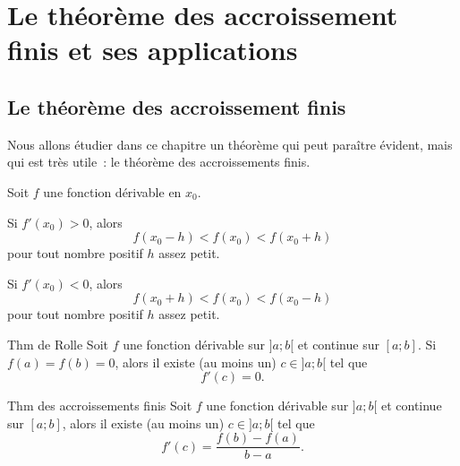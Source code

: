 \documentclass[a4paper,12pt]{article}
\begin{document}
\newpage
\section{Le théorème des accroissement finis et ses applications}

\subsection{Le théorème des accroissement finis}
Nous allons étudier dans ce chapitre un théorème qui peut paraître évident, mais qui est très utile~: le théorème des accroissements finis. 
\medskip

\begin{prop}
	\tcblower
Soit $f$ une fonction dérivable en $x_0$. 

Si $f'(x_0)>0$, alors
\[f(x_0-h)<f(x_0)<f(x_0+h)\]
pour tout nombre positif $h$ assez petit. 

Si $f'(x_0)<0$, alors
\[f(x_0+h)<f(x_0)<f(x_0-h)\]
pour tout nombre positif $h$ assez petit. 
\end{prop}

\begin{thm}
	Thm de Rolle
	\tcblower
	Soit $f$ une fonction dérivable sur $] a;b[$ et continue sur $[a;b]$. Si $f(a)=f(b)=0$, alors il existe (au moins un) $c\in] a;b[$ tel que 
	\[f'(c)=0.\]
\end{thm}
\begin{thm}
	Thm des accroissements finis
	\tcblower
	Soit $f$ une fonction dérivable sur $] a;b[$ et continue sur $[a;b]$, alors il existe (au moins un) $c\in ]a;b[$ tel que 
	\[f'(c)=\dfrac{f(b)-f(a)}{b-a}.\]
\end{thm}
\end{document}
